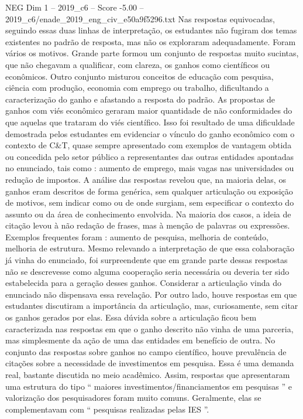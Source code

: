 \begin{textsample}{NEG Dim 1 – 2019\_c6 – Score -5.00 – 2019\_c6/enade\_2019\_eng\_civ\_e50a9f5296.txt}
Nas respostas equivocadas, seguindo essas duas linhas de interpretação, os estudantes não fugiram dos temas existentes no padrão de resposta, mas não os exploraram adequadamente.
Foram vários os motivos.
Grande parte formou um conjunto de respostas muito sucintas, que não chegavam a qualificar, com clareza, os ganhos como científicos ou econômicos.
Outro conjunto misturou conceitos de educação com pesquisa, ciência com produção, economia com emprego ou trabalho, dificultando a caracterização do ganho e afastando a resposta do padrão.
As propostas de ganhos com viés econômico geraram maior quantidade de não conformidades do que aquelas que trataram do viés científico.
Isso foi resultado de uma dificuldade demostrada pelos estudantes em evidenciar o vínculo do ganho econômico com o contexto de C\&T, quase sempre apresentado com exemplos de vantagem obtida ou concedida pelo setor público a representantes das outras entidades apontadas no enunciado, tais como : aumento de emprego, mais vagas nas universidades ou redução de impostos.
A análise das respostas revelou que, na maioria delas, os ganhos eram descritos de forma genérica, sem qualquer articulação ou exposição de motivos, sem indicar como ou de onde surgiam, sem especificar o contexto do assunto ou da área de conhecimento envolvida.
Na maioria dos casos, a ideia de citação levou à não redação de frases, mas à menção de palavras ou expressões.
Exemplos frequentes foram : aumento de pesquisa, melhoria de conteúdo, melhoria de estrutura.
Mesmo relevando a interpretação de que essa colaboração já vinha do enunciado, foi surpreendente que em grande parte dessas respostas não se descrevesse como alguma cooperação seria necessária ou deveria ter sido estabelecida para a geração desses ganhos.
Considerar a articulação vinda do enunciado não dispensava essa revelação.
Por outro lado, houve respostas em que estudantes discutiram a importância da articulação, mas, curiosamente, sem citar os ganhos gerados por elas.
Essa dúvida sobre a articulação ficou bem caracterizada nas respostas em que o ganho descrito não vinha de uma parceria, mas simplesmente da ação de uma das entidades em benefício de outra.
No conjunto das respostas sobre ganhos no campo científico, houve prevalência de citações sobre a necessidade de investimentos em pesquisa.
Essa é uma demanda real, bastante discutida no meio acadêmico.
Assim, respostas que apresentaram uma estrutura do tipo “ maiores investimentos/financiamentos em pesquisas ” e valorização dos pesquisadores foram muito comuns.
Geralmente, elas se complementavam com “ pesquisas realizadas pelas IES ”.

\end{textsample}
